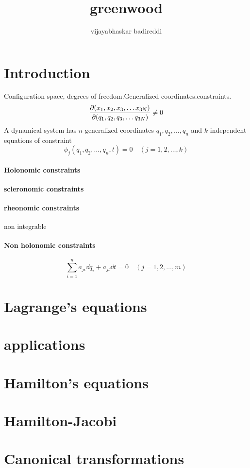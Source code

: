 \documentclass[12pt]{article}
\title{greenwood}
\author{vijayabhaskar badireddi}
\begin{document}

\section*{Introduction}
Configuration space,
degrees of freedom.Generalized coordinates.constraints.
\[\pdv{(x_1,x_2,x_3,\ldots x_{3N})}{(q_1,q_2,q_3,\ldots q_{3N})}\neq 0\]
A dynamical system has $n$ generalized coordinates $q_1,q_2,\ldots,q_n$ and $k$ independent equations of constraint \[\phi_j(q_1,q_2,\ldots,q_n,t)=0\quad(j=1,2,\ldots,k)\]
\paragraph{Holonomic constraints}
\paragraph{scleronomic constraints}
\paragraph{rheonomic constraints}
non integrable 
\paragraph{Non holonomic constraints}
\[\sum_{i=1}^{n}a_{ji}\dd{q_i}+a_{jt}\dd{t}=0\quad(j=1,2,\ldots,m)\]
\section*{Lagrange's equations}
\section*{applications}
\section*{Hamilton's equations}
\section*{Hamilton-Jacobi}
\section*{Canonical transformations}
\end{document}
